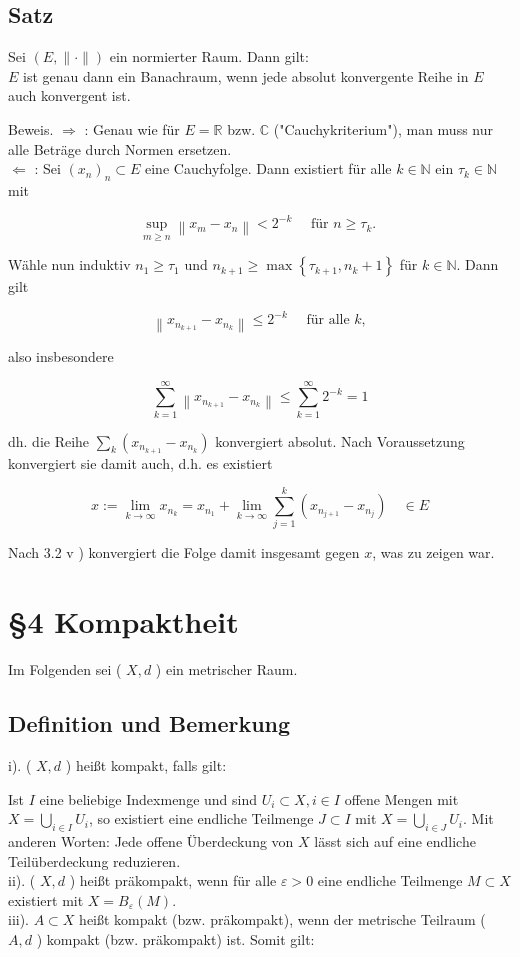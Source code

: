 \documentclass[10pt, letterpaper]{article}
\begin{document}
\subsection*{Satz}
Sei $(E,\|\cdot\|)$ ein normierter Raum. Dann gilt:\\
$E$ ist genau dann ein Banachraum, wenn jede absolut konvergente Reihe in $E$ auch konvergent ist.

Beweis. $\Longrightarrow$ : Genau wie für $E=\mathbb{R}$ bzw. $\mathbb{C}$ ("Cauchykriterium"), man muss nur alle Beträge durch Normen ersetzen.\\
$\Longleftarrow$ : Sei $\left(x_{n}\right)_{n} \subset E$ eine Cauchyfolge. Dann existiert für alle $k \in \mathbb{N}$ ein $\tau_{k} \in \mathbb{N}$ mit

$$
\sup _{m \geq n}\left\|x_{m}-x_{n}\right\|<2^{-k} \quad \text { für } n \geq \tau_{k} \text {. }
$$

Wähle nun induktiv $n_{1} \geq \tau_{1}$ und $n_{k+1} \geq \max \left\{\tau_{k+1}, n_{k}+1\right\}$ für $k \in \mathbb{N}$. Dann gilt

$$
\left\|x_{n_{k+1}}-x_{n_{k}}\right\| \leq 2^{-k} \quad \text { für alle } k,
$$

also insbesondere

$$
\sum_{k=1}^{\infty}\left\|x_{n_{k+1}}-x_{n_{k}}\right\| \leq \sum_{k=1}^{\infty} 2^{-k}=1
$$

dh. die Reihe $\sum_{k}\left(x_{n_{k+1}}-x_{n_{k}}\right)$ konvergiert absolut. Nach Voraussetzung konvergiert sie damit auch, d.h. es existiert

$$
x:=\lim _{k \rightarrow \infty} x_{n_{k}}=x_{n_{1}}+\lim _{k \rightarrow \infty} \sum_{j=1}^{k}\left(x_{n_{j+1}}-x_{n_{j}}\right) \quad \in E
$$

Nach 3.2 v ) konvergiert die Folge damit insgesamt gegen $x$, was zu zeigen war.

\section*{§4 Kompaktheit}
Im Folgenden sei ( $X, d$ ) ein metrischer Raum.

\subsection*{Definition und Bemerkung}
i). ( $X, d$ ) heißt kompakt, falls gilt:

Ist $I$ eine beliebige Indexmenge und sind $U_{i} \subset X, i \in I$ offene Mengen mit $X=\bigcup_{i \in I} U_{i}$, so existiert eine endliche Teilmenge $J \subset I$ mit $X=\bigcup_{i \in J} U_{i}$. Mit anderen Worten: Jede offene Überdeckung von $X$ lässt sich auf eine endliche Teilüberdeckung reduzieren.\\
ii). ( $X, d$ ) heißt präkompakt, wenn für alle $\varepsilon>0$ eine endliche Teilmenge $M \subset X$ existiert mit $X=B_{\varepsilon}(M)$.\\
iii). $A \subset X$ heißt kompakt (bzw. präkompakt), wenn der metrische Teilraum ( $A, d$ ) kompakt (bzw. präkompakt) ist. Somit gilt:
\end{document}
